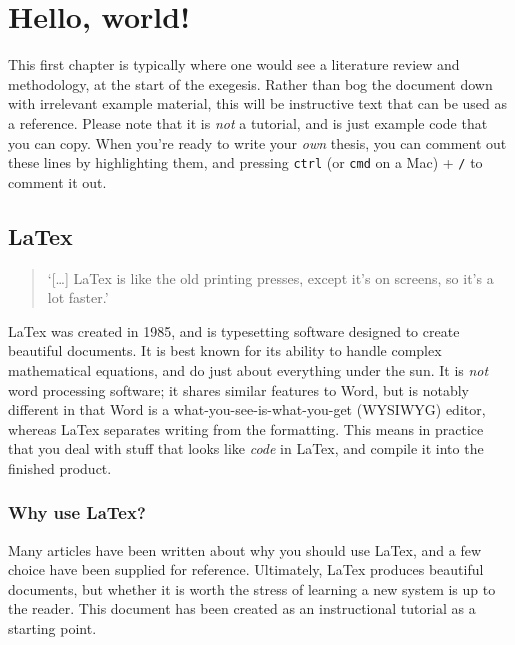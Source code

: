 
\renewcommand*{\thefootnote}{\arabic{footnote}}
\setcounter{footnote}{0}

\chapter{Hello, world!}

This first chapter is typically where one would see a literature review and methodology, at the start of the exegesis.
Rather than bog the document down with irrelevant example material, this will be instructive text that can be used as a reference.
Please note that it is \emph{not} a tutorial, and is just example code that you can copy.
When you're ready to write your \emph{own} thesis, you can comment out these lines by highlighting them, and pressing \lstinline{ctrl} (or \lstinline{cmd} on a Mac) + \lstinline{/} to comment it out.

\section{LaTex}

\begin{quotation}
    `[\ldots] LaTex is like the old printing presses, except it's on screens, so it's a lot faster.'
\end{quotation}
LaTex was created in 1985, and is typesetting software designed to create beautiful documents. 
It is best known for its ability to handle complex mathematical equations, and do just about everything under the sun.
It is \emph{not} word processing software; it shares similar features to Word, but is notably different in that Word is a what-you-see-is-what-you-get (WYSIWYG) editor, whereas LaTex separates writing from the formatting.
This means in practice that you deal with stuff that looks like \emph{code} in LaTex, and compile it into the finished product. 

\subsection{Why use LaTex?}
Many articles have been written about why you should use LaTex, and a few choice have been supplied for reference.
Ultimately, LaTex produces beautiful documents, but whether it is worth the stress of learning a new system is up to the reader.
This document has been created as an instructional tutorial as a starting point.

